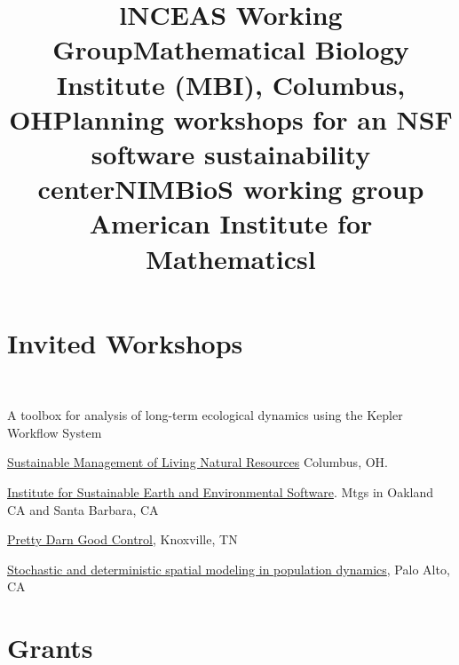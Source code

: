 \documentclass[margin]{res}
\begin{document}
\begin{resume}
\section{Invited Workshops}
\begin{format}
\title{l} \\
\body
\end{format}

\title{NCEAS Working Group}
\begin{position}
A toolbox for analysis of long-term ecological dynamics using the Kepler Workflow System
\vspace{-.25cm}
\end{position}


\title{Mathematical Biology Institute (MBI), Columbus, OH}
\begin{position}
\href{http://www.mbi.ohio-state.edu/2013/ws3description.html}{Sustainable Management of Living Natural Resources} Columbus, OH.  
\vspace{-.25cm}
\end{position}

\title{Planning workshops for an NSF software sustainability center}
\begin{position}
\href{http://isees.nceas.ucsb.edu}{Institute for Sustainable Earth and Environmental Software}. Mtgs in Oakland CA and Santa Barbara, CA
\vspace{-.25cm}
\end{position}



\title{NIMBioS working group }
\begin{position}
\href{http://www.nimbios.org/workinggroups/WG_PDG}{Pretty Darn Good Control}, Knoxville, TN  
\vspace{-.25cm}
\end{position}

\title{American Institute for Mathematics}
\begin{position}
 \href{http://www.aimath.org/WWN/populationmodel}{Stochastic and deterministic spatial modeling in population dynamics}, Palo Alto, CA  \vspace{-.25cm}
\end{position}

 
\section{Grants}
\begin{format}
\title{l} \\
\body
\end{format}


\end{resume}
\end{document}
